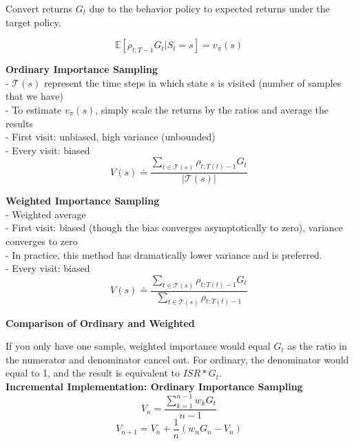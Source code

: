 \documentclass{article}
\begin{document}
\noindent
Convert returns $G_{t}$ due to the behavior policy to expected returns under the
target policy.

\begin{equation}
\mathbb{E}\left[\rho_{t: T-1} G_{t} | S_{t}=s\right]=v_{\pi}(s)
\end{equation}

\noindent
\textbf{Ordinary Importance Sampling}\\
- $\mathcal{T}(s)$ represent the time steps in which state s is visited (number
of samples that we have)\\
- To estimate $v_{\pi}(s)$, simply scale the returns by the ratios and average
the results\\
- First visit: unbiased, high variance (unbounded)\\
- Every visit: biased
\begin{equation}
V(s) \doteq \frac{\sum_{t \in \mathcal{T}(s)} \rho_{t: T(t)-1} G_{t}}{|\mathcal{T}(s)|}
\end{equation}

\noindent
\textbf{Weighted Importance Sampling}\\
- Weighted average\\
- First visit: biased (though the bias converges asymptotically to zero), variance converges to zero\\
- In practice, this method has dramatically lower variance and is preferred.\\
- Every visit: biased
\begin{equation}
V(s) \doteq \frac{\sum_{t \in \mathcal{T}(s)} \rho_{t: T(t)-1} G_{t}}{\sum_{t \in \mathcal{T}(s)} \rho_{t: T(t)-1}}
\end{equation}

\noindent
\textbf{Comparison of Ordinary and Weighted}

\noindent
If you only have one sample, weighted importance would equal $G_{t}$ as the
ratio in the numerator and denominator cancel out. For ordinary, the denominator
would equal to 1, and the result is equivalent to $ISR * G_{t}$.\\

\noindent
\textbf{Incremental Implementation: Ordinary Importance Sampling}
\begin{equation}
V_{n}=\frac{\sum_{k=1}^{n-1} w_{k} G_{t}}{n-1}
\end{equation}
\begin{equation}
V_{n+1}=V_{n}+\frac{1}{n}\left(w_{n} G_{n}-V_{n}\right)
\end{equation}
\end{document}
